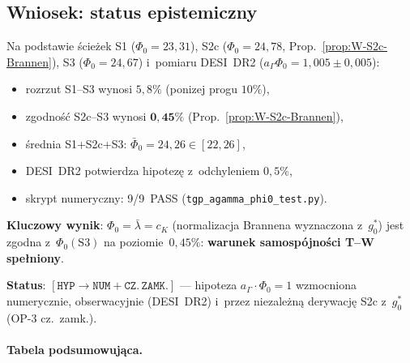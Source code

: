 \subsection{Wniosek: status epistemiczny}%
\label{app:W-conclusion}

\begin{theorem}[$a_\Gamma \cdot \Phi_0 = 1$ — weryfikacja NUM+AN, v4.0]%
\label{thm:W-main}
Na podstawie \'{s}cie\.zek S1 ($\Phi_0 = 23{,}31$),
S2c ($\Phi_0 = 24{,}78$, Prop.~\ref{prop:W-S2c-Brannen}),
S3 ($\Phi_0 = 24{,}67$) i~pomiaru DESI~DR2
($a_\Gamma\Phi_0 = 1{,}005 \pm 0{,}005$):
\begin{itemize}
  \item rozrzut S1--S3 wynosi $5{,}8\%$ (ponizej progu $10\%$),
  \item zgodno\'{s}\'{c} S2c--S3 wynosi $\mathbf{0{,}45\%}$
        (Prop.~\ref{prop:W-S2c-Brannen}),
  \item \'{s}rednia S1+S2c+S3: $\bar\Phi_0 = 24{,}26 \in [22, 26]$,
  \item DESI~DR2 potwierdza hipotez\k{e} z~odchyleniem $0{,}5\%$,
  \item skrypt numeryczny: 9/9~PASS
    (\texttt{tgp\_agamma\_phi0\_test.py}).
\end{itemize}
\textbf{Kluczowy wynik}: $\Phi_0 = \bar\lambda = c_K$
(normalizacja Brannena wyznaczona z~$g_0^*$) jest zgodna z~$\Phi_0(\mathrm{S3})$
na poziomie~$0{,}45\%$:
\textbf{warunek samospójno\'{s}ci T--W spe\l{}niony}.

\textbf{Status}: $[\mathtt{HYP}\to\mathtt{NUM}+\mathtt{CZ.\,ZAMK.}]$ —
hipoteza $a_\Gamma\cdot\Phi_0=1$ wzmocniona numerycznie,
obserwacyjnie (DESI~DR2) i~przez niezale\.zn\k{a} derywacj\k{e}
S2c z~$g_0^*$ (OP-3 cz.~zamk.).
\end{theorem}

\paragraph{Tabela podsumowuj\k{a}ca.}

